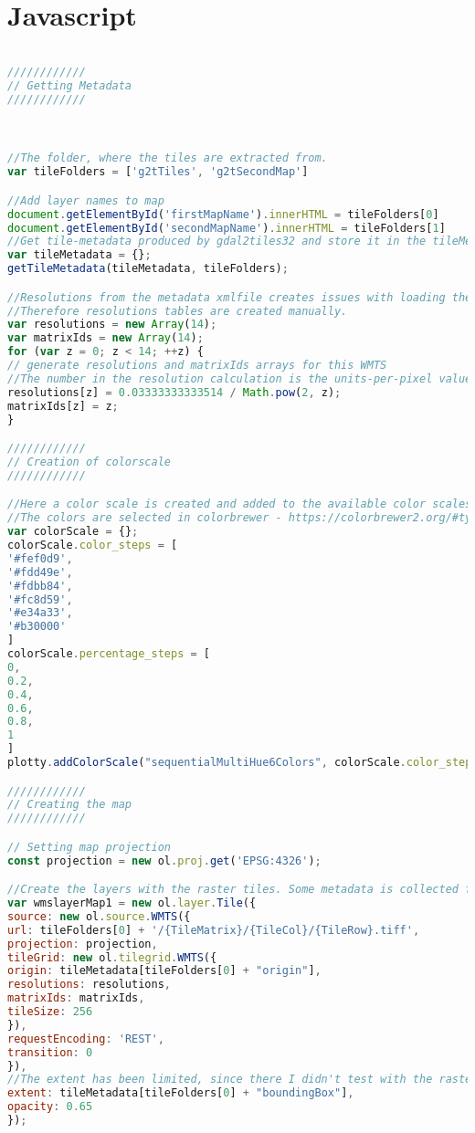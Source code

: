 \section{Javascript}
\begin{lstlisting}[language=JavaScript, caption={The JavaScript for the map}, label= VoresJS,escapechar=|]

////////////
// Getting Metadata
////////////



//The folder, where the tiles are extracted from.
var tileFolders = ['g2tTiles', 'g2tSecondMap']

//Add layer names to map
document.getElementById('firstMapName').innerHTML = tileFolders[0]
document.getElementById('secondMapName').innerHTML = tileFolders[1]
//Get tile-metadata produced by gdal2tiles32 and store it in the tileMetadata object.
var tileMetadata = {};
getTileMetadata(tileMetadata, tileFolders);

//Resolutions from the metadata xmlfile creates issues with loading the correct file if any zoomlayers are excluded
//Therefore resolutions tables are created manually.
var resolutions = new Array(14);
var matrixIds = new Array(14);
for (var z = 0; z < 14; ++z) {
// generate resolutions and matrixIds arrays for this WMTS
//The number in the resolution calculation is the units-per-pixel value at zoomlayer 0 in the xml file generated by gdal2tiles
resolutions[z] = 0.03333333333514 / Math.pow(2, z);
matrixIds[z] = z;
}

////////////
// Creation of colorscale
////////////

//Here a color scale is created and added to the available color scales
//The colors are selected in colorbrewer - https://colorbrewer2.org/#type=sequential&scheme=OrRd&n=6
var colorScale = {};
colorScale.color_steps = [
'#fef0d9',
'#fdd49e',
'#fdbb84',
'#fc8d59',
'#e34a33',
'#b30000'
]
colorScale.percentage_steps = [
0,
0.2,
0.4,
0.6,
0.8,
1
]
plotty.addColorScale("sequentialMultiHue6Colors", colorScale.color_steps, colorScale.percentage_steps);

////////////
// Creating the map
////////////

// Setting map projection
const projection = new ol.proj.get('EPSG:4326');

//Create the layers with the raster tiles. Some metadata is collected from the metadta object
var wmslayerMap1 = new ol.layer.Tile({
source: new ol.source.WMTS({
url: tileFolders[0] + '/{TileMatrix}/{TileCol}/{TileRow}.tiff',
projection: projection,
tileGrid: new ol.tilegrid.WMTS({
origin: tileMetadata[tileFolders[0] + "origin"],
resolutions: resolutions,
matrixIds: matrixIds,
tileSize: 256
}),
requestEncoding: 'REST',
transition: 0
}),
//The extent has been limited, since there I didn't test with the raster for the entire world
extent: tileMetadata[tileFolders[0] + "boundingBox"],
opacity: 0.65
});


\end{lstlisting}
